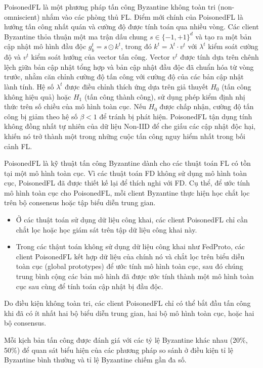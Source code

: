PoisonedFL là một phương pháp tấn công Byzantine không toàn tri (non-omniscient) nhắm vào các phòng thủ FL. Điểm mới chính của PoisonedFL là hướng tấn công nhất quán và cường độ được tính toán qua nhiều vòng. Các client Byzantine thỏa thuận một ma trận dấu chung $s \in \{-1, +1\}^d$ và tạo ra một bản cập nhật mô hình đầu độc $g^t_b = s \odot k^t$, trong đó $k^t = \lambda^t \cdot v^t$ với $\lambda^t$ kiểm soát cường độ và $v^t$ kiểm soát hướng của vector tấn công. Vector $v^t$ được tính dựa trên chênh lệch giữa bản cập nhật tổng hợp và bản cập nhật đầu độc đã chuẩn hóa từ vòng trước, nhằm căn chỉnh cường độ tấn công với cường độ của các bản cập nhật lành tính. Hệ số $\lambda^t$ được điều chỉnh thích ứng dựa trên giả thuyết $H_0$ (tấn công không hiệu quả) hoặc $H_1$ (tấn công thành công), sử dụng phép kiểm định nhị thức trên số chiều của mô hình toàn cục. Nếu $H_0$ được chấp nhận, cường độ tấn công bị giảm theo hệ số $\beta < 1$ để tránh bị phát hiện. PoisonedFL tận dụng tính không đồng nhất tự nhiên của dữ liệu Non-IID để che giấu các cập nhật độc hại, khiến nó trở thành một trong những cuộc tấn công nguy hiểm nhất trong bối cảnh FL.

PoisonedFL là kỹ thuật tấn công Byzantine dành cho các thuật toán FL có tồn tại một mô hình toàn cục. Vì các thuật toán FD không sử dụng mô hình toàn cục, PoisonedFL đã được thiết kế lại để thích nghi với FD. Cụ thể, để ước tính mô hình toàn cục cho PoisonedFL, mỗi client Byzantine thực hiện học chắt lọc trên bộ consensus hoặc tập biểu diễn trung gian.

\begin{itemize}
    \item Ở các thuật toán sử dụng dữ liệu công khai, các client PoisonedFL chỉ cần chắt lọc hoặc học giám sát trên tập dữ liệu công khai này.
    \item Trong các thậut toán không sử dụng dữ liệu công khai như FedProto, các client PoisonedFL kết hợp dữ liệu của chính nó và chắt lọc trên biểu diễn toàn cục (global prototypes) để ước tính mô hình toàn cục, sau đó chúng trung bình cộng các bản mô hình đã được ước tính thành một mô hình toàn cục sau cùng để tính toán cập nhật bị đầu độc.
\end{itemize}

Do điều kiện không toàn tri, các client PoisonedFL chỉ có thể bắt đầu tấn công khi đã có ít nhất hai bộ biểu diễn trung gian, hai bộ mô hình toàn cục, hoặc hai bộ consensus.

Mỗi kịch bản tấn công được đánh giá với các tỷ lệ Byzantine khác nhau (20\%, 50\%) để quan sát biểu hiện của các phương pháp so sánh ở điều kiện tỉ lệ Byzantine bình thường và tỉ lệ Byzantine chiếm gần đa số.

